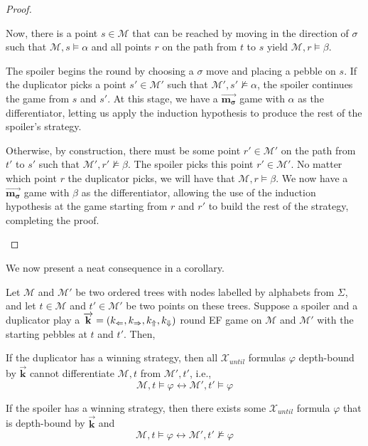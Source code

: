 \documentclass[a4paper,UKenglish,cleveref, autoref, thm-restate, numberwithinsect]{lipics-v2021}
\def\Larrow{\ensuremath\mathord{\Leftarrow}}
\def\Rarrow{\ensuremath\mathord{\Rightarrow}}
\def\Uarrow{\ensuremath\mathord{\Uparrow}}
\def\Darrow{\ensuremath\mathord{\Downarrow}}
\newcommand{\myvec}[1]{\overrightarrow{\mathbf{#1}}}
\begin{document}
\begin{proof}
\begin{description}
            Now, there is a point $s \in \mathcal{M}$ that can be reached by moving in the direction of $\sigma$ such that $\mathcal{M}, s \vDash \alpha$ and all points $r$ on the path from $t$ to $s$ yield $\mathcal{M}, r \vDash \beta$.

            The spoiler begins the round by choosing a $\sigma$ move and placing a pebble on $s$. If the duplicator picks a point $s' \in \mathcal{M}'$ such that $\mathcal{M}', s' \nvDash \alpha$, the spoiler continues the game from $s$ and $s'$. At this stage, we have a $\myvec{m_\sigma}$ game with $\alpha$ as the differentiator, letting us apply the induction hypothesis to produce the rest of the spoiler's strategy.

            Otherwise, by construction, there must be some point $r' \in \mathcal{M}'$ on the path from $t'$ to $s'$ such that $\mathcal{M}', r' \nvDash \beta$. The spoiler picks this point $r' \in \mathcal{M}'$. No matter which point $r$ the duplicator picks, we will have that $\mathcal{M}, r \vDash \beta$. We now have a $\myvec{m_\sigma}$ game with $\beta$ as the differentiator, allowing the use of the induction hypothesis at the game starting from $r$ and $r'$ to build the rest of the strategy, completing the proof.
    \end{description}
\end{proof}
We now present a neat consequence in a corollary.
\begin{corollary}
    Let $\mathcal{M}$ and $\mathcal{M}'$ be two ordered trees with nodes labelled by alphabets from $\Sigma$, and let $t \in \mathcal{M}$ and $t' \in \mathcal{M}'$ be two points on these trees. Suppose a spoiler and a duplicator play a $\myvec{k} = (k_{\Larrow}, k_{\Rarrow}, k_{\Uarrow}, k_{\Darrow})$ round EF game on $\mathcal{M}$ and $\mathcal{M}'$ with the starting pebbles at $t$ and $t'$. Then,

    \begin{bracketenumerate}
        \item If the duplicator has a winning strategy, then all $\mathcal{X}_{until}$ formulas $\varphi$ depth-bound by $\myvec{k}$ cannot differentiate $\mathcal{M}, t$ from $\mathcal{M}', t'$, i.e.,
            \begin{equation*}
                \mathcal{M}, t \vDash \varphi \longleftrightarrow \mathcal{M}', t' \vDash \varphi
            \end{equation*}

        \item If the spoiler has a winning strategy, then there exists some $\mathcal{X}_{until}$ formula $\varphi$ that is depth-bound by $\myvec{k}$ and
            \begin{equation*}
                \mathcal{M}, t \vDash \varphi \longleftrightarrow \mathcal{M}', t' \nvDash \varphi
            \end{equation*}
    \end{bracketenumerate}
\end{corollary}
\end{document}
